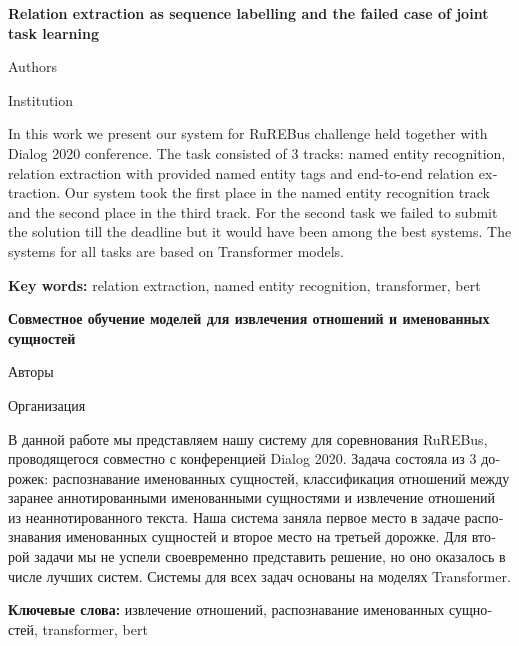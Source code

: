 \documentclass{dialogue}
\begin{document}
\begin{otherlanguage}{english}
\begin{center}
{\Large\bfseries{Relation extraction as sequence labelling and the failed case of joint task learning}}

\medskip

Authors

\medskip

Institution
\end{center}

In this work we present our system for RuREBus challenge held together with Dialog 2020 conference. The task consisted of 3 tracks: named entity recognition, relation extraction with provided named entity tags and end-to-end relation extraction. Our system took the first place in the named entity recognition track and the second place in the third track. For the second task we failed to submit the solution till the deadline but it would have been among the best systems. The systems for all tasks are based on Transformer models.

\textbf{Key words:} relation extraction, named entity recognition, transformer, bert
\end{otherlanguage}

\bigskip

\begin{otherlanguage}{russian}
\begin{center}
{\Large\bfseries{Совместное обучение моделей для извлечения отношений и именованных сущностей}}

\medskip

Авторы

\medskip

Организация
\end{center}

В данной работе мы представляем нашу систему для соревнования RuREBus, проводящегося совместно с конференцией Dialog 2020. Задача состояла из 3 дорожек: распознавание именованных сущностей, классификация отношений между заранее аннотированными именованными сущностями и извлечение отношений из неаннотированного текста. Наша система заняла первое место в задаче распознавания именованных сущностей и второе место на третьей дорожке. Для второй задачи мы не успели своевременно представить решение, но оно оказалось в числе лучших систем. Системы для всех задач основаны на моделях Transformer.
\medskip

\textbf{Ключевые слова:} извлечение отношений, распознавание именованных сущностей, transformer, bert
\end{otherlanguage}
\end{document}
